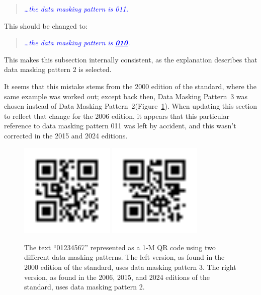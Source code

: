 \documentclass[a4paper,twoside]{article}
\newcommand{\quotestandard}[1]{\textcolor{blue}{\textit{#1}}}
\newcommand{\ddd}{\dots}
\newcommand{\change}[1]{\underline{\textbf{#1}}}
\begin{document}
\begin{quote}
\quotestandard{\ddd the data masking pattern is 011.}
\end{quote}

This should be changed to:

\begin{quote}
\quotestandard{\ddd the data masking pattern is \change{010}.}
\end{quote}

This makes this subsection internally consistent, as the explanation describes that data masking pattern 2 is selected.

It seems that this mistake stems from the 2000 edition of the standard, where the same example was worked out;
except back then, Data Masking Pattern~3 was chosen instead of Data Masking Pattern~2(Figure~\ref{fig:dmp-changed-2}).
When updating this section to reflect that change for the 2006 edition, it appears that this particular reference
to data masking pattern 011 was left by accident, and this wasn't corrected in the 2015 and 2024 editions.

\begin{figure}[h!]
\centering
\includegraphics[width=0.4\textwidth]{images/qrcode_iso18004_2000_AnnexG_1Mp3.png}
\includegraphics[width=0.4\textwidth]{images/qrcode_iso18004_2006_2015_2024_AnnexI_1Mp2.png}
\caption{The text ``01234567'' represented as a 1-M QR code using two different data masking patterns.
         The left version, as found in the 2000 edition of the standard, uses data masking pattern 3.
         The right version, as found in the 2006, 2015, and 2024 editions of the standard, uses data masking pattern 2.}
\label{fig:dmp-changed-2}
\end{figure}
\end{document}
